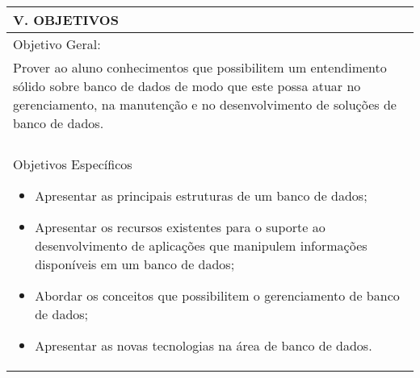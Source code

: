 \documentclass[12pt]{article}
\begin{document}
\begin{longtable}{|L{1.025\textwidth}|} \hline
%
{\bf V. OBJETIVOS } \\ \hline
%
Objetivo Geral:\\

Prover ao aluno conhecimentos que possibilitem um entendimento sólido sobre banco de dados de modo que este possa atuar no gerenciamento, na manutenção e no desenvolvimento de soluções de banco de dados.\\
\\
Objetivos Específicos 
\begin{itemize}
\item Apresentar as principais estruturas de um banco de dados;
\item Apresentar os recursos existentes para o suporte ao desenvolvimento de aplicações que manipulem informações disponíveis em um banco de dados;
\item Abordar os conceitos que possibilitem o gerenciamento de banco de dados;
\item Apresentar as novas tecnologias na área de banco de dados.
\end{itemize}

\\ \hline
\end{longtable}
\end{document}
